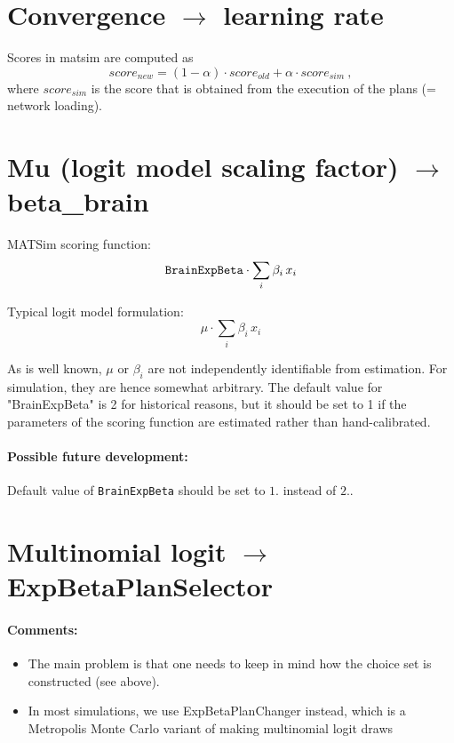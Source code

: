 \section{Convergence $\to$ learning rate}

Scores in matsim are computed as
\[
score_{new} = (1-\alpha) \cdot score_{old} +   \alpha \cdot score_{sim} \ , 
\]
where $score_{sim}$ is the score that is obtained from   the execution of the plans (= network loading).

\section{Mu (logit model scaling factor) $\to$ beta\_brain}


MATSim scoring function: 
\[
{\tt BrainExpBeta} \cdot \sum_i \beta_i \, x_i
\]

Typical logit model formulation: 
\[
\mu \cdot \sum_i \beta_i \, x_i
\]

As is well known, $\mu$ or $\beta_i$ are not independently
identifiable from estimation. For simulation, they are hence somewhat
arbitrary. The default value for "BrainExpBeta" is 2 for historical
reasons, but it should be set to 1 if the parameters of the scoring
function are estimated rather than hand-calibrated.

\paragraph{Possible future development:}

Default value of \verb$BrainExpBeta$ should be set to $1.$ instead of $2.$.


\section{Multinomial logit $\to$ ExpBetaPlanSelector}


\paragraph{Comments:}
\begin{itemize}
	\item The main problem is that one needs to keep in mind how the choice set is constructed (see above).
	\item In most simulations, we use ExpBetaPlanChanger instead, which is a   Metropolis Monte Carlo variant of making multinomial logit draws
\end{itemize}

